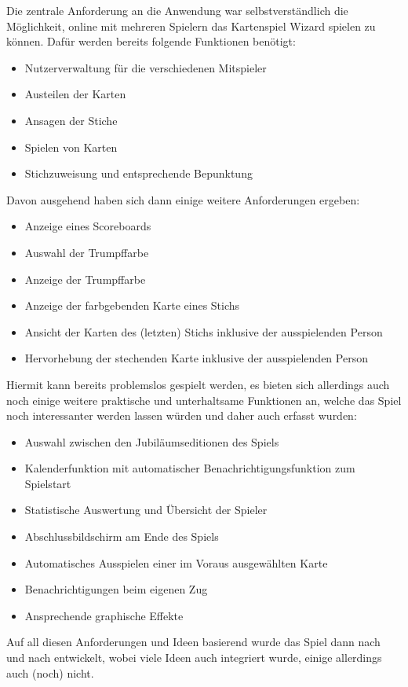 Die zentrale Anforderung an die Anwendung war selbstverständlich die Möglichkeit, online mit mehreren Spielern das Kartenspiel Wizard spielen zu können. Dafür werden bereits folgende Funktionen benötigt:
\begin{itemize}
	\item Nutzerverwaltung für die verschiedenen Mitspieler
	\item Austeilen der Karten
	\item Ansagen der Stiche
	\item Spielen von Karten
	\item Stichzuweisung und entsprechende Bepunktung
\end{itemize}
Davon ausgehend haben sich dann einige weitere Anforderungen ergeben:
\begin{itemize}
	\item Anzeige eines Scoreboards
	\item Auswahl der Trumpffarbe
	\item Anzeige der Trumpffarbe
	\item Anzeige der farbgebenden Karte eines Stichs
	\item Ansicht der Karten des (letzten) Stichs inklusive der ausspielenden Person
	\item Hervorhebung der stechenden Karte inklusive der ausspielenden Person
\end{itemize}
Hiermit kann bereits problemslos gespielt werden, es bieten sich allerdings auch noch einige weitere praktische und unterhaltsame Funktionen an, welche das Spiel noch interessanter werden lassen würden und daher auch erfasst wurden:
\begin{itemize}
	\item Auswahl zwischen den Jubiläumseditionen des Spiels
	\item Kalenderfunktion mit automatischer Benachrichtigungsfunktion zum Spielstart
	\item Statistische Auswertung und Übersicht der Spieler
	\item Abschlussbildschirm am Ende des Spiels
	\item Automatisches Ausspielen einer im Voraus ausgewählten Karte
	\item Benachrichtigungen beim eigenen Zug
	\item Ansprechende graphische Effekte
\end{itemize}
Auf all diesen Anforderungen und Ideen basierend wurde das Spiel dann nach und nach entwickelt, wobei viele Ideen auch integriert wurde, einige allerdings auch (noch) nicht.


